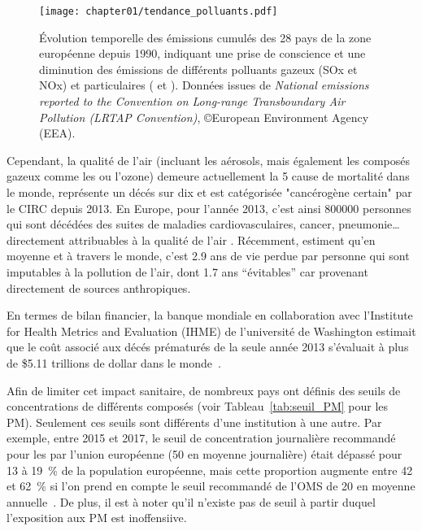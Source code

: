 \begin{figure}[ht]
    \centering
    \texttt{[image: chapter01/tendance\_polluants.pdf]}
    \caption{Évolution temporelle des émissions cumulés des 28 pays de la zone européenne
    depuis 1990, indiquant une prise de conscience et une diminution des émissions de
différents polluants gazeux (SOx et NOx) et particulaires (\PMdix{} et \PMdc). Données
issues de \textit{National emissions reported to the Convention on Long-range
Transboundary Air Pollution (LRTAP Convention)}, ©European Environment Agency (EEA).}%
\label{fig:chapter01/tendance_polluants}
\end{figure}


Cependant, la qualité de l'air (incluant les aérosols, mais également les
composés gazeux comme les  ou l'ozone) demeure actuellement la 5\ieme{} cause de
mortalité dans le monde, représente un décés sur dix et est catégorisée "cancérogène
certain" par le CIRC depuis 2013. En Europe, pour l'année 2013, c'est
ainsi \num{800000} personnes qui sont décédées des suites de maladies cardiovasculaires,
cancer, pneumonie… directement attribuables à la qualité de l'air
\autocite{worldhealthorganizationAmbient2016}. Récemment, \cite{lelieveldLoss2020}
estiment qu'en moyenne et à travers le monde, c'est \num{2.9} ans de vie perdue par personne
qui sont imputables à la pollution de l'air, dont \num{1.7} ans ``évitables'' car provenant
directement de sources anthropiques.

En termes de bilan financier, la banque mondiale en collaboration avec l'Institute for
Health Metrics and Evaluation (IHME) de l'université de Washington estimait que le coût
associé aux décés prématurés de la seule année 2013 s'évaluait à plus de \$5.11 trillions
de dollar dans le monde~\autocite{worldbankCost2016}.

Afin de limiter cet impact sanitaire, de nombreux pays ont définis des seuils de
concentrations de différents composés (voir Tableau~\ref{tab:seuil_PM} pour les PM).
Seulement ces seuils sont différents d'une institution à une autre. Par exemple, entre
2015 et 2017, le seuil de concentration journalière recommandé pour les \PMdix{} par
l'union européenne (\SI{50}{\ugm} en moyenne journalière) était dépassé pour 13 à
19~\% de la population européenne, mais cette proportion augmente entre 42 et 62~\% si
l'on prend en compte le seuil recommandé de l'OMS de \SI{20}{\ugm} en moyenne
annuelle~\autocite{europeanenvironmentagencyAir2019}.  De plus, il est à noter qu'il
n'existe pas de seuil à partir duquel l'exposition aux PM est inoffensiive.

